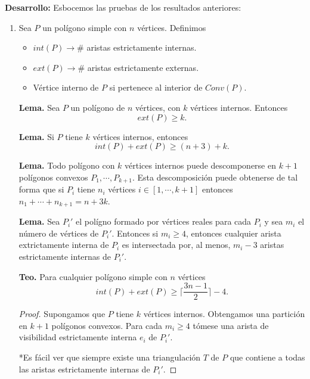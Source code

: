 \textbf{Desarrollo:} Esbocemos las pruebas de los resultados anteriores:
\begin{enumerate}
\item   Sea $P$ un polígono simple con $n$ vértices. Definimos
  \begin{itemize}
  \item $int(P) \rightarrow \#$ aristas estrictamente internas. 
  \item $ext(P) \rightarrow \#$ aristas estrictamente externas.
  \item Vértice interno de $P$ si pertenece al interior de $Conv(P)$.
  \end{itemize}
  \begin{center}
    \textbf{Lema.} Sea $P$ un polígono de $n$ vértices, con $k$ vértices internos. Entonces \[ext(P) \geq k.\]
  \end{center}
  \begin{center}
    \textbf{Lema.} Si $P$ tiene $k$ vértices internos, entonces \[int(P) + ext(P) \geq (n + 3) + k.\]
  \end{center}
  \begin{center}
    \textbf{Lema.} Todo polígono con $k$ vértices internos puede descomponerse en $k + 1$ polígonos
    convexos $P_1, \dotsm, P_{k + 1}$. Esta descomposición puede obtenerse de tal forma
    que si $P_i$ tiene $n_i$ vértices $i \in [1, \dotsm, k+1]$ entonces $n_1 + \dotsm + n_{k + 1} = n + 3k$.
  \end{center}
  \begin{center}
    \textbf{Lema.} Sea $P_i'$ el polígno formado por vértices reales para cada $P_i$ y sea $m_i$ el número
    de vértices de $P_i'$. Entonces si $m_i \geq 4$, entonces cualquier arista extrictamente
    interna de $P_i$ es intersectada por, al menos, $m_i - 3$ aristas estrictamente internas
    de $P_i'$.
  \end{center}
  \begin{center}
    \textbf{Teo.} Para cualquier polígono simple con $n$ vértices
    \[int(P) + ext(P) \geq \lceil \frac{3n - 1}{2} \rceil - 4.\]

    \begin{proof}
      Supongamos que $P$ tiene $k$ vértices internos. Obtengamos una
      partición en $k + 1$ polígonos convexos. Para cada $m_i \geq 4$ tómese una arista
      de visibilidad estrictamente interna $e_i$ de $P_i'$.\newline

      *Es fácil ver que siempre existe una triangulación $T$ de $P$ que contiene a todas las aristas
      estrictamente internas de $P_i'$.
      

\end{proof}
\end{center}
\end{enumerate}
